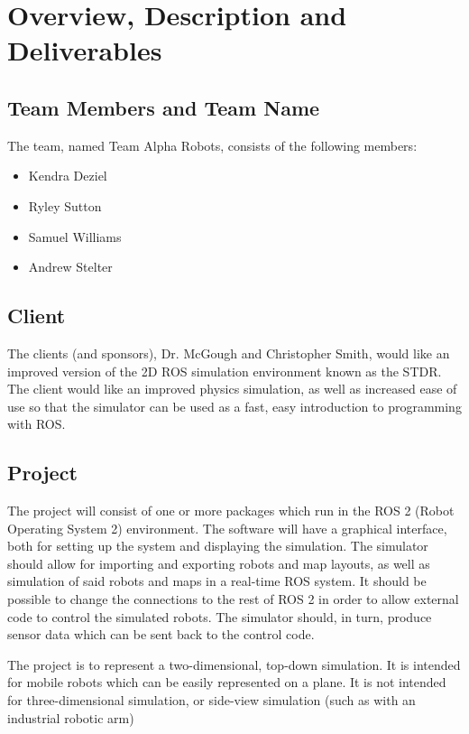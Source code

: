 

\chapter{Overview, Description and Deliverables}

\section{Team Members and Team Name}
The team, named Team Alpha Robots, consists of the following members:
\begin{itemize}
	\item Kendra Deziel
	\item Ryley Sutton
	\item Samuel Williams
	\item Andrew Stelter
\end{itemize}

\section{Client}
The clients (and sponsors), Dr. McGough and Christopher Smith, would like an improved version of the 2D ROS simulation environment known as the STDR. The client would like an improved physics simulation, as well as increased ease of use so that the simulator can be used as a fast, easy introduction to programming with ROS.

\section{Project}
The project will consist of one or more packages which run in the ROS 2 (Robot Operating System 2) environment. The software will have a graphical interface, both for setting up the system and displaying the simulation. The simulator should allow for importing and exporting robots and map layouts, as well as simulation of said robots and maps in a real-time ROS system. It should be possible to change the connections to the rest of ROS 2 in order to allow external code to control the simulated robots. The simulator should, in turn, produce sensor data which can be sent back to the control code.

The project is to represent a two-dimensional, top-down simulation. It is intended for mobile robots which can be easily represented on a plane. It is not intended for three-dimensional simulation, or side-view simulation (such as with an industrial robotic arm)

